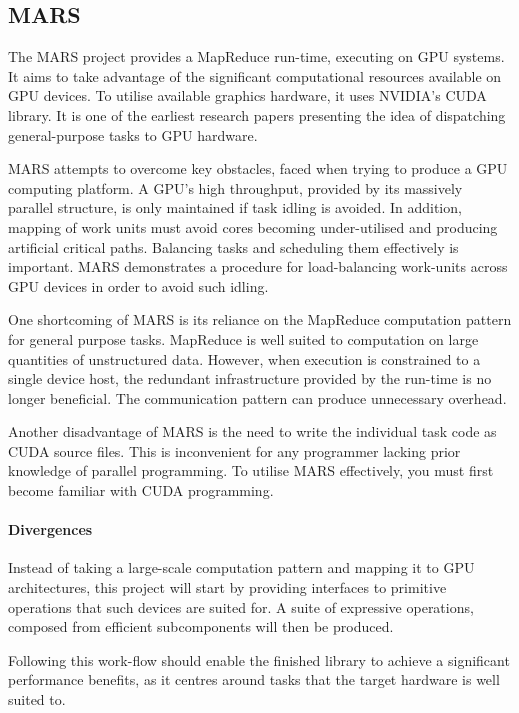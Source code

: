 \subsection{MARS}
The MARS\cite{mars} project provides a MapReduce\cite{mapreduce} run-time, executing on \ac{GPU} systems.
It aims to take advantage of the significant computational resources available on \ac{GPU} devices. To utilise available graphics hardware, it uses NVIDIA's \ac{CUDA} library. It is one of the earliest research papers presenting the idea of dispatching general-purpose tasks to \ac{GPU} hardware.

MARS attempts to overcome key obstacles, faced when trying to produce a \ac{GPU} computing platform.
A \ac{GPU}'s high throughput, provided by its massively parallel structure, is only maintained if task idling is avoided. In addition, mapping of work units must avoid cores becoming under-utilised and producing artificial critical paths. Balancing tasks and scheduling them effectively is important. MARS demonstrates a procedure for load-balancing work-units across \ac{GPU} devices in order to avoid such idling.

One shortcoming of MARS is its reliance on the MapReduce computation pattern for general purpose tasks. MapReduce is well suited to computation on large quantities of unstructured data. However, when execution is constrained to a single device host, the redundant infrastructure provided by the run-time is no longer beneficial. The communication pattern can produce unnecessary overhead.

Another disadvantage of MARS is the need to write the individual task code as \ac{CUDA} source files. This is inconvenient for any programmer lacking prior knowledge of parallel programming. To utilise MARS effectively, you must first become familiar with \ac{CUDA} programming.

\paragraph*{Divergences}
Instead of taking a large-scale computation pattern and mapping it to \ac{GPU} architectures, this project will start by providing interfaces to primitive operations that such devices are suited for. A suite of expressive operations, composed from efficient subcomponents will then be produced.

Following this work-flow should enable the finished library to achieve a significant performance benefits, as it centres around tasks that the target hardware is well suited to.

